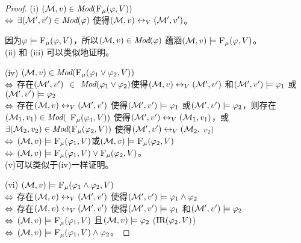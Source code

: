 \begin{proof}
	(i) $({\cal M},v) \in \textit{Mod}({\textsc{F}_{\textsc{$\mu$}}}(\varphi, V))$\\
	$\Leftrightarrow$ $\exists ({\cal M}',v') \in \textit{Mod}(\varphi)$ 使得$({\cal M}, v) \leftrightarrow_V ({\cal M}',v')$。
	
	因为$\varphi \models {\textsc{F}_{\textsc{$\mu$}}}(\varphi, V)$，所以$({\cal M},v) \in \textit{Mod}(\varphi)$ 蕴涵$({\cal M},v) \models {\textsc{F}_{\textsc{$\mu$}}}(\varphi, V)$。\\
	
	
	(ii) 和 (iii) 可以类似地证明。
	
	(iv)  $({\cal M},v)\in \textit{Mod}({\textsc{F}_{\textsc{$\mu$}}}(\varphi_1 \vee \varphi_2, V))$\\
	$\Leftrightarrow$ 存在$({\cal M}',v')$ $\in$  $\textit{Mod}(\varphi_1\vee \varphi_2)$使得$({\cal M},v) \leftrightarrow_V ({\cal M}',v')$ 和$({\cal M}',v') \models \varphi_1$ 或$({\cal M}',v') \models \varphi_2$ \\
	$\Leftrightarrow$ 存在$({\cal M},v) \leftrightarrow_V ({\cal M}',v')$ 使得$({\cal M}',v') \models \varphi_1$ 或$({\cal M}',v') \models \varphi_2$，则存在$({\cal M}_1,v_1) \in \textit{Mod}($ ${\textsc{F}_{\textsc{$\mu$}}}(\varphi_1, V))$ 使得$({\cal M}',v') \leftrightarrow_V ({\cal M}_1,v_1)$，或$\exists({\cal M}_2,v_2) \in \textit{Mod}({\textsc{F}_{\textsc{$\mu$}}}(\varphi_2, V))$ 使得$({\cal M}',v') \leftrightarrow_V ({\cal M}_2,$ $v_2)$\\
	$\Leftrightarrow$ $({\cal M},v) \models {\textsc{F}_{\textsc{$\mu$}}}(\varphi_1, V)$或$({\cal M},v) \models  {\textsc{F}_{\textsc{$\mu$}}}(\varphi_2, V)$\\
	$\Leftrightarrow$ $({\cal M},v) \models {\textsc{F}_{\textsc{$\mu$}}}(\varphi_1, V) \vee {\textsc{F}_{\textsc{$\mu$}}}(\varphi_2, V)$。
	\\
	
	
	(v)可以类似于(iv)一样证明。
	
	(vi) $({\cal M},v) \models {\textsc{F}_{\textsc{$\mu$}}}(\varphi_1 \wedge \varphi_2,V)$\\
	$\Leftrightarrow$ 存在$({\cal M}, v) \leftrightarrow_V ({\cal M}',v')$ 使得$({\cal M}',v') \models \varphi_1 \wedge \varphi_2$\\
	$\Leftrightarrow$ 存在$({\cal M}, v) \leftrightarrow_V ({\cal M}',v')$ 使得$({\cal M}', v') \models \varphi_1$ 和$({\cal M}', v') \models \varphi_2$\\
	$\Leftrightarrow$  $({\cal M}, v) \models {\textsc{F}_{\textsc{$\mu$}}}(\varphi_1,V)$ 且$({\cal M},v) \models \varphi_2$ \hfill ($\textrm{IR}(\varphi_2, V)$)\\
	$\Leftrightarrow$ $({\cal M},v) \models {\textsc{F}_{\textsc{$\mu$}}}(\varphi_1,V) \wedge \varphi_2$。
\end{proof}

